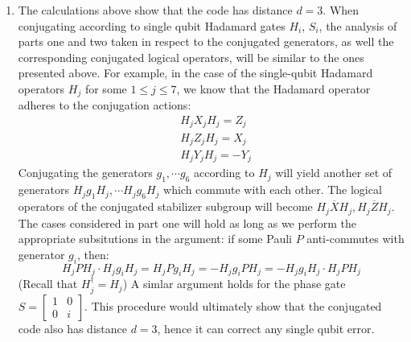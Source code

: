 \documentclass[12pt]{article}%
\begin{document}
\begin{enumerate}
	\item The calculations above show that the code has distance $d = 3$. When conjugating according to single qubit Hadamard gates $H_i$, $S_i$, the analysis of parts one and two taken in respect to the conjugated generators, as well the corresponding conjugated logical operators, will be similar to the ones presented above. For example, in the case of the single-qubit Hadamard operators $H_j$ for some $1 \leq j \leq 7$, we know that the Hadamard operator adheres to the conjugation actions:
		\begin{align*}
			& H_jX_jH_j = Z_j \\
			& H_jZ_jH_j = X_j \\
			& H_jY_jH_j = -Y_j
		\end{align*}
		Conjugating the generators $g_1,\cdots g_6$ according to $H_j$ will yield another set of generators $H_jg_1H_j, \cdots H_jg_6H_j$ which commute with each other. The logical operators of the conjugated stabilizer subgroup will become $H_j\overline{X}H_j, H_j\overline{Z}H_j$. The cases considered in part one will hold as long as we perform the appropriate subsitutions in the argument: if some Pauli $P$ anti-commutes with generator $g_i$, then:
		\begin{equation*}
			H_jPH_j\cdot H_jg_iH_j = H_j P g_i H_j = - H_j g_i P H_j = - H_jg_i H_j \cdot H_j P H_j
		\end{equation*}
		(Recall that $H_j^\dagger = H_j$) \newline
		A simlar argument holds for the phase gate $S = \left[ \begin{matrix} 1 & 0 \\ 0 & i \end{matrix} \right]$. This procedure would ultimately show that the conjugated code also has distance $d = 3$, hence it can correct any single qubit error.
		\end{enumerate}
\end{document}
